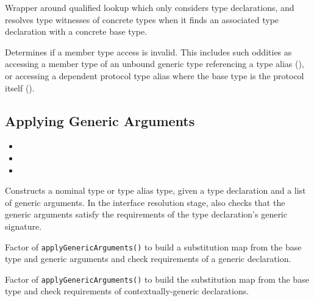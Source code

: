\documentclass[../generics]{subfiles}
\begin{document}
Wrapper around qualified lookup which only considers type declarations, and resolves type witnesses of concrete types when it finds an associated type declaration with a concrete base type.

Determines if a member type access is invalid. This includes such oddities as accessing a member type of an unbound generic type referencing a type alias (), or accessing a dependent protocol type alias where the base type is the protocol itself ().

\subsection*{Applying Generic Arguments}

\begin{itemize}
\item {}
\item {}
\item {}
\end{itemize}

Constructs a nominal type or type alias type, given a type declaration and a list of generic arguments. In the interface resolution stage, also checks that the generic arguments satisfy the requirements of the type declaration's generic signature.

Factor of \texttt{applyGenericArguments()} to build a substitution map from the base type and generic arguments and check requirements of a generic declaration.

Factor of \texttt{applyGenericArguments()} to build the substitution map from the base type and check requirements of contextually-generic declarations.
\end{document}
